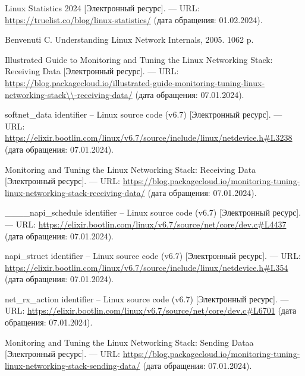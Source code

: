
\renewcommand\bibname{СПИСОК ИСПОЛЬЗОВАННЫХ ИСТОЧНИКОВ}
\begin{thebibliography}{}
	
\setlength\bibindent{1.25cm}
\makeatletter
\let\old@biblabel\@biblabel
\def\@biblabel#1{\kern\bibindent\old@biblabel{#1}}
\makeatother

 Linux Statistics 2024 [Электронный ресурс]. --- URL: \url{https://truelist.co/blog/linux-statistics/} (дата обращения: 01.02.2024).

 Benvenuti C. Understanding Linux Network Internals, 2005. 1062 p.

 Illustrated Guide to Monitoring and Tuning the Linux Networking Stack: Receiving Data [Электронный ресурс]. --- URL: \url{https://blog.packagecloud.io/illustrated-guide-monitoring-tuning-linux-networking-stack\\-receiving-data/} (дата обращения: 07.01.2024).

 softnet\_data identifier -- Linux source code (v6.7) [Электронный ресурс]. --- URL: \url{https://elixir.bootlin.com/linux/v6.7/source/include/linux/netdevice.h#L3238} (дата обращения: 07.01.2024).

 Monitoring and Tuning the Linux Networking Stack: Receiving Data [Электронный ресурс]. --- URL: \url{https://blog.packagecloud.io/monitoring-tuning-linux-networking-stack-receiving-data/} (дата обращения: 07.01.2024).

 \_\_\_\_napi\_schedule identifier -- Linux source code (v6.7) [Электронный ресурс]. --- URL: \url{https://elixir.bootlin.com/linux/v6.7/source/net/core/dev.c#L4437} (дата обращения: 07.01.2024).

 napi\_struct identifier -- Linux source code (v6.7) [Электронный ресурс]. --- URL: \url{https://elixir.bootlin.com/linux/v6.7/source/include/linux/netdevice.h#L354} (дата обращения: 07.01.2024).

 net\_rx\_action identifier -- Linux source code (v6.7) [Электронный ресурс]. --- URL: \url{https://elixir.bootlin.com/linux/v6.7/source/net/core/dev.c#L6701} (дата обращения: 07.01.2024).

 Monitoring and Tuning the Linux Networking Stack: Sending Dataa [Электронный ресурс]. --- URL: \url{https://blog.packagecloud.io/monitoring-tuning-linux-networking-stack-sending-data/} (дата обращения: 07.01.2024).


\end{thebibliography}
